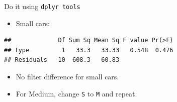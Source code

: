 \documentclass[
  ignorenonframetext,
]{beamer}
\newenvironment{Shaded}{\begin{snugshade}}{\end{snugshade}}
\newcommand{\DataTypeTok}[1]{\textcolor[rgb]{0.13,0.29,0.53}{#1}}
\newcommand{\KeywordTok}[1]{\textcolor[rgb]{0.13,0.29,0.53}{\textbf{#1}}}
\newcommand{\NormalTok}[1]{#1}
\newcommand{\OperatorTok}[1]{\textcolor[rgb]{0.81,0.36,0.00}{\textbf{#1}}}
\newcommand{\StringTok}[1]{\textcolor[rgb]{0.31,0.60,0.02}{#1}}
\providecommand{\tightlist}{%
  \setlength{\itemsep}{0pt}\setlength{\parskip}{0pt}}
\begin{document}
\begin{frame}[fragile]{Do it using \texttt{dplyr\ tools}}
\protect\hypertarget{do-it-using-dplyr-tools}{}

\begin{itemize}
\tightlist
\item
  Small cars:
\end{itemize}

\begin{Shaded}
\end{Shaded}

\begin{verbatim}
##             Df Sum Sq Mean Sq F value Pr(>F)
## type         1   33.3   33.33   0.548  0.476
## Residuals   10  608.3   60.83
\end{verbatim}

\begin{itemize}
\item
  No filter difference for small cars.
\item
  For Medium, change \texttt{S} to \texttt{M} and repeat.
\end{itemize}

\end{frame}
\end{document}
